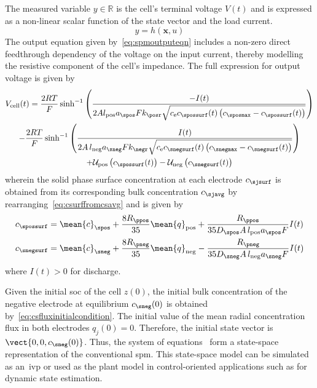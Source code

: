 The measured variable $y ∈ \mathbb{R}$ is the cell's terminal voltage
$V(t)$ and is expressed as a non-linear  scalar function of the state vector and
the load current.
\begin{equation}\label{eq:spmoutputeqn}
    y = h(\mathbf{x},u)
\end{equation}
The output  equation given by~\cref{eq:spmoutputeqn} includes  a non-zero direct
feedthrough dependency  of the voltage  on the input current,  thereby modelling
the resistive component of the cell's  impedance. The full expression for output
voltage is given by
\begin{multline}
    V_\text{cell}(t) = \frac{2 R T}{F }\sinh^{-1} \left( \frac{- I(t)}{2 A
    l_\text{pos} a_\spos F k_\posr \sqrt{c_\text{e} c_\spossurf(t)
    \left(c_\sposmax - c_\spossurf(t)\right)}}\right) \\
    - \frac{2 R T}{F }\sinh^{-1} \left( \frac{I(t)}{2 A \, l_\text{neg} a_\sneg F
    k_\negr \sqrt{c_\text{e} c_\snegsurf(t) \left(c_\snegmax - c_\snegsurf(t)\right)}}\right) \\
    + \mathcal{U}_\text{pos}\left(c_\spossurf(t)\right) -
    \mathcal{U}_\text{neg}\left(c_\snegsurf(t)\right)
\end{multline}
wherein  the solid  phase surface  concentration at  each electrode  $c_\sjsurf$
is   obtained  from   its   corresponding  bulk   concentration  $c_\sjavg$   by
rearranging~\cref{eq:csurffromcsavg} and is given by
\begin{align}
    c_\spossurf &= \mean{c}_\spos  + \frac{8R_\ppos}{35} \mean{q}_\text{pos} +\frac{R_\ppos}{35 D_\spos A \, l_\text{pos} a_\spos F} I(t) \\
    c_\snegsurf &= \mean{c}_\sneg  + \frac{8R_\pneg}{35} \mean{q}_\text{neg} -\frac{R_\pneg}{35 D_\sneg A \, l_\text{neg} a_\sneg F} I(t)\label{eq:csurfnegfromcavgneg}
\end{align}
where $I(t) > 0 $ for discharge.

Given   the  initial   \gls{soc}  of   the   cell  $z(0)$,   the  initial   bulk
concentration  of   the  negative  electrode  at   equilibrium  $c_\sneg(0)$  is
obtained  by~\cref{eq:csfluxinitialcondition}. The  initial  value  of the  mean
radial  concentration  flux   in  both  electrodes  $q_j(0)   =  0$.  Therefore,
the  initial  state  vector  is $\vect{0,0,c_\sneg(0)}$.  Thus,  the  system  of
equations~  form  a
state-space representation of the conventional \gls{spm}. This state-space model
can be simulated as an~\gls{ivp} or  used as the plant model in control-oriented
applications such as for dynamic state estimation.
